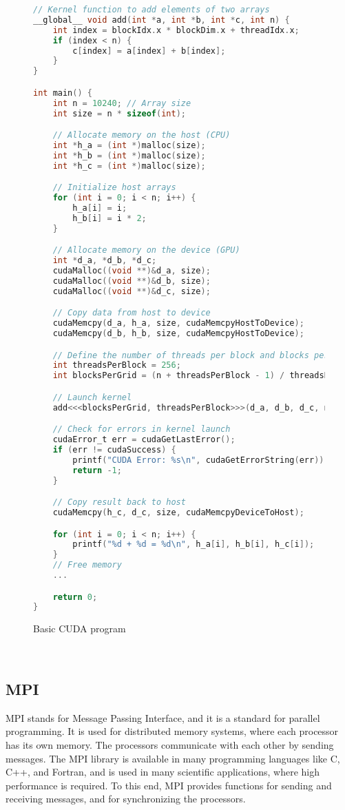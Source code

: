 \documentclass[../../main.tex]{subfiles}
\begin{document}
\begin{figure}[h]
\vspace{-5em}
\begin{lstlisting}[language=C, basicstyle=\ttfamily\small]
// Kernel function to add elements of two arrays
__global__ void add(int *a, int *b, int *c, int n) {
    int index = blockIdx.x * blockDim.x + threadIdx.x;
    if (index < n) {
        c[index] = a[index] + b[index];
    }
}

int main() {
    int n = 10240; // Array size
    int size = n * sizeof(int);

    // Allocate memory on the host (CPU)
    int *h_a = (int *)malloc(size);
    int *h_b = (int *)malloc(size);
    int *h_c = (int *)malloc(size);

    // Initialize host arrays
    for (int i = 0; i < n; i++) {
        h_a[i] = i;
        h_b[i] = i * 2;
    }

    // Allocate memory on the device (GPU)
    int *d_a, *d_b, *d_c;
    cudaMalloc((void **)&d_a, size);
    cudaMalloc((void **)&d_b, size);
    cudaMalloc((void **)&d_c, size);

    // Copy data from host to device
    cudaMemcpy(d_a, h_a, size, cudaMemcpyHostToDevice);
    cudaMemcpy(d_b, h_b, size, cudaMemcpyHostToDevice);

    // Define the number of threads per block and blocks per grid
    int threadsPerBlock = 256;
    int blocksPerGrid = (n + threadsPerBlock - 1) / threadsPerBlock;

    // Launch kernel
    add<<<blocksPerGrid, threadsPerBlock>>>(d_a, d_b, d_c, n);

    // Check for errors in kernel launch
    cudaError_t err = cudaGetLastError();
    if (err != cudaSuccess) {
        printf("CUDA Error: %s\n", cudaGetErrorString(err));
        return -1;
    }

    // Copy result back to host
    cudaMemcpy(h_c, d_c, size, cudaMemcpyDeviceToHost);

    for (int i = 0; i < n; i++) {
        printf("%d + %d = %d\n", h_a[i], h_b[i], h_c[i]);
    }
    // Free memory
    ...

    return 0;
}
\end{lstlisting}
    \caption{Basic CUDA program}
    \label{fig:cuda}
\end{figure}




~\\
\subsection{MPI}
MPI stands for Message Passing Interface, and it is a standard for parallel programming. It is used for distributed memory systems, where each processor has its own memory. The processors communicate with each other by sending messages. The MPI library is available in many programming languages like C, C++, and Fortran, and is used in many scientific applications, where high performance is required. To this end, MPI provides functions for sending and receiving messages, and for synchronizing the processors. 
\end{document}
